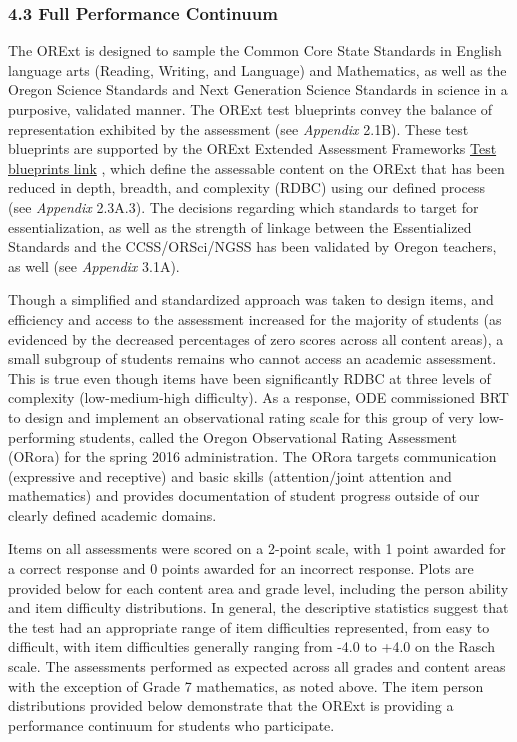 \documentclass[]{article}
\begin{document}
\subsubsection{4.3 Full Performance
Continuum}\label{full-performance-continuum}

The ORExt is designed to sample the Common Core State Standards in
English language arts (Reading, Writing, and Language) and Mathematics,
as well as the Oregon Science Standards and Next Generation Science
Standards in science in a purposive, validated manner. The ORExt test
blueprints convey the balance of representation exhibited by the
assessment (see \emph{Appendix} 2.1B). These test blueprints are
supported by the ORExt Extended Assessment Frameworks \color{link}
\href{http://www.brtprojects.org/publications/training-modules}{Test
blueprints link} \color{black}, which define the assessable content on
the ORExt that has been reduced in depth, breadth, and complexity (RDBC)
using our defined process (see \emph{Appendix} 2.3A.3). The decisions
regarding which standards to target for essentialization, as well as the
strength of linkage between the Essentialized Standards and the
CCSS/ORSci/NGSS has been validated by Oregon teachers, as well (see
\emph{Appendix} 3.1A).

Though a simplified and standardized approach was taken to design items,
and efficiency and access to the assessment increased for the majority
of students (as evidenced by the decreased percentages of zero scores
across all content areas), a small subgroup of students remains who
cannot access an academic assessment. This is true even though items
have been significantly RDBC at three levels of complexity
(low-medium-high difficulty). As a response, ODE commissioned BRT to
design and implement an observational rating scale for this group of
very low-performing students, called the Oregon Observational Rating
Assessment (ORora) for the spring 2016 administration. The ORora targets
communication (expressive and receptive) and basic skills
(attention/joint attention and mathematics) and provides documentation
of student progress outside of our clearly defined academic domains.

Items on all assessments were scored on a 2-point scale, with 1 point
awarded for a correct response and 0 points awarded for an incorrect
response. Plots are provided below for each content area and grade
level, including the person ability and item difficulty distributions.
In general, the descriptive statistics suggest that the test had an
appropriate range of item difficulties represented, from easy to
difficult, with item difficulties generally ranging from -4.0 to +4.0 on
the Rasch scale. The assessments performed as expected across all grades
and content areas with the exception of Grade 7 mathematics, as noted
above. The item person distributions provided below demonstrate that the
ORExt is providing a performance continuum for students who participate.
\end{document}

